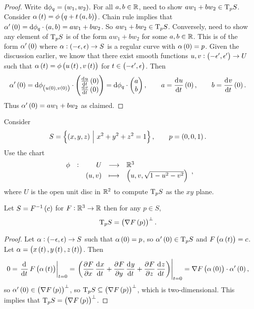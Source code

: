 \begin{proof}
Write $ \d\phi_q = \br{w_1, w_2} $. For all $ a, b \in \mathbb{R} $, need to show $ aw_1 + bw_2 \in \mathrm{T}_p S $. Consider $ \alpha\br{t} = \phi\br{q + t\br{a, b}} $. Chain rule implies that $ \alpha'\br{0} = \d\phi_q \cdot \br{a, b} = aw_1 + bw_2 $. So $ aw_1 + bw_2 \in \mathrm{T}_p S $. Conversely, need to show any element of $ \mathrm{T}_p S $ is of the form $ aw_1 + bw_2 $ for some $ a, b \in \mathbb{R} $. This is of the form $ \alpha'\br{0} $ where $ \alpha : \br{-\epsilon, \epsilon} \to S $ is a regular curve with $ \alpha\br{0} = p $. Given the discussion earlier, we know that there exist smooth functions $ u, v : \br{-\epsilon', \epsilon'} \to U $ such that $ \alpha\br{t} = \phi\br{u\br{t}, v\br{t}} $ for $ t \in \br{-\epsilon', \epsilon} $. Then
$$ \alpha'\br{0} = \d\phi_{\br{u\br{0}, v\br{0}}} \cdot \twobyone{\tod{u}{t}\br{0}}{\tod{v}{t}\br{0}} = \d\phi_q \cdot \twobyone{a}{b}, \qquad a = \dod{u}{t}\br{0}, \qquad b = \dod{v}{t}\br{0}. $$
Thus $ \alpha'\br{0} = aw_1 + bw_2 $ as claimed.
\end{proof}

\begin{exercise*}
Consider
$$ S = \cbr{\br{x, y, z} \st x^2 + y^2 + z^2 = 1}, \qquad p = \br{0, 0, 1}. $$
Use the chart
$$ \function[\phi]{U}{\RR^3}{\br{u, v}}{\br{u, v, \sqrt{1 - u^2 - v^2}}}, $$
where $ U $ is the open unit disc in $ \mathbb{R}^2 $ to compute $ \mathrm{T}_p S $ as the $ xy $ plane.
\end{exercise*}

\pagebreak


\begin{proposition}
Let $ S = F^{-1}\br{c} $ for $ F : \mathbb{R}^3 \to \mathbb{R} $ then for any $ p \in S $,
$$ \T_p S = \br{\nabla F\br{p}}^\perp. $$
\end{proposition}

\begin{proof}
Let $ \alpha : \br{-\epsilon, \epsilon} \to S $ such that $ \alpha\br{0} = p $, so $ \alpha'\br{0} \in \T_p S $ and $ F\br{\alpha\br{t}} = c $. Let $ \alpha = \br{x\br{t}, y\br{t}, z\br{t}} $. Then
$$ 0 = \eval{\dod{}{t}F\br{\alpha\br{t}}}_{t = 0} = \eval{\br{\dpd{F}{x}\dod{x}{t} + \dpd{F}{y}\dod{y}{t} + \dpd{F}{z}\dod{z}{t}}}_{t = 0} = \nabla F\br{\alpha\br{0}} \cdot \alpha'\br{0}, $$
so $ \alpha'\br{0} \in \br{\nabla F\br{p}}^\perp $, so $ \T_p S \subseteq \br{\nabla F\br{p}}^\perp $, which is two-dimensional. This implies that $ \T_p S = \br{\nabla F\br{p}}^\perp $.
\end{proof}


